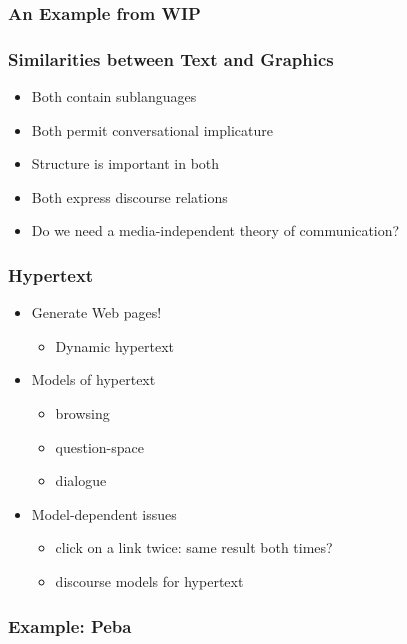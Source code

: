 \documentclass[compress,color=usenames]{beamer}
\begin{document}
\begin{frame}
\frametitle{
An Example from WIP}

\label{f85}
 
\end{frame}

\begin{frame}
\frametitle{
Similarities between
Text and Graphics}

\label{f87}
\begin{itemize}
\item {{Both contain sublanguages}}
\item {{Both permit conversational implicature}}
\item {{Structure is important in both}}
\item {{Both express discourse relations}}
\item {{Do we need a media-independent theory of communication?}}
\end{itemize}
 
\end{frame}

\begin{frame}
\frametitle{
Hypertext}

\label{f89}
\begin{itemize}
\item {{Generate Web pages!}}
\begin{itemize}
\item Dynamic hypertext
\end{itemize}
\item {{Models of hypertext}}
\begin{itemize}
\item browsing
\item question-space
\item dialogue
\end{itemize}
\item {{Model-dependent issues}}
\begin{itemize}
\item click on a link twice: same result both times?
\item discourse models for hypertext
\end{itemize}
\end{itemize}
 
\end{frame}

\begin{frame}
\frametitle{
Example:  Peba}

\label{f91}
 
\end{frame}
\end{document}
